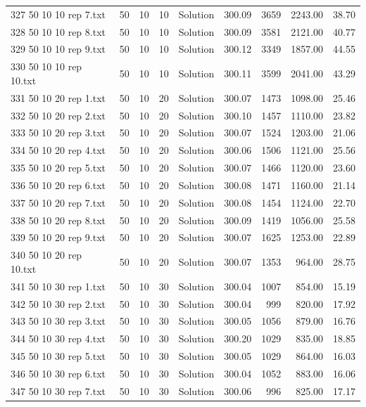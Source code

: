 \begin{longtable}{lrrllrrrr}
327 50 10 10 rep 7.txt & 50 & 10 & 10 & Solution & 300.09 & 3659 & 2243.00 & 38.70\\
328 50 10 10 rep 8.txt & 50 & 10 & 10 & Solution & 300.09 & 3581 & 2121.00 & 40.77\\
329 50 10 10 rep 9.txt & 50 & 10 & 10 & Solution & 300.12 & 3349 & 1857.00 & 44.55\\
330 50 10 10 rep 10.txt & 50 & 10 & 10 & Solution & 300.11 & 3599 & 2041.00 & 43.29\\
331 50 10 20 rep 1.txt & 50 & 10 & 20 & Solution & 300.07 & 1473 & 1098.00 & 25.46\\
332 50 10 20 rep 2.txt & 50 & 10 & 20 & Solution & 300.10 & 1457 & 1110.00 & 23.82\\
333 50 10 20 rep 3.txt & 50 & 10 & 20 & Solution & 300.07 & 1524 & 1203.00 & 21.06\\
334 50 10 20 rep 4.txt & 50 & 10 & 20 & Solution & 300.06 & 1506 & 1121.00 & 25.56\\
335 50 10 20 rep 5.txt & 50 & 10 & 20 & Solution & 300.07 & 1466 & 1120.00 & 23.60\\
336 50 10 20 rep 6.txt & 50 & 10 & 20 & Solution & 300.08 & 1471 & 1160.00 & 21.14\\
337 50 10 20 rep 7.txt & 50 & 10 & 20 & Solution & 300.08 & 1454 & 1124.00 & 22.70\\
338 50 10 20 rep 8.txt & 50 & 10 & 20 & Solution & 300.09 & 1419 & 1056.00 & 25.58\\
339 50 10 20 rep 9.txt & 50 & 10 & 20 & Solution & 300.07 & 1625 & 1253.00 & 22.89\\
340 50 10 20 rep 10.txt & 50 & 10 & 20 & Solution & 300.07 & 1353 & 964.00 & 28.75\\
341 50 10 30 rep 1.txt & 50 & 10 & 30 & Solution & 300.04 & 1007 & 854.00 & 15.19\\
342 50 10 30 rep 2.txt & 50 & 10 & 30 & Solution & 300.04 & 999 & 820.00 & 17.92\\
343 50 10 30 rep 3.txt & 50 & 10 & 30 & Solution & 300.05 & 1056 & 879.00 & 16.76\\
344 50 10 30 rep 4.txt & 50 & 10 & 30 & Solution & 300.20 & 1029 & 835.00 & 18.85\\
345 50 10 30 rep 5.txt & 50 & 10 & 30 & Solution & 300.05 & 1029 & 864.00 & 16.03\\
346 50 10 30 rep 6.txt & 50 & 10 & 30 & Solution & 300.04 & 1052 & 883.00 & 16.06\\
347 50 10 30 rep 7.txt & 50 & 10 & 30 & Solution & 300.06 & 996 & 825.00 & 17.17\\

\end{longtable}
